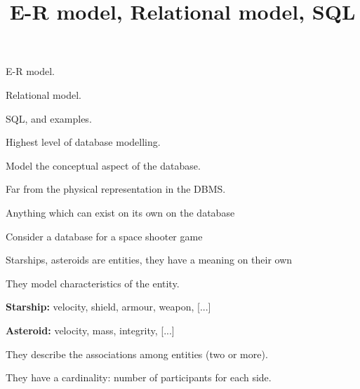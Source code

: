 \documentclass{beamer}
\title{E-R model, Relational model, SQL}
\author{ }
\institute{Hogeschool Rotterdam \\ 
Rotterdam, Netherlands}
\date{}
\begin{document}
\maketitle

\begin{slide}{
\item E-R model.
\item Relational model.
\item SQL, and examples.
}\end{slide}

\begin{slide}{
\item Highest level of database modelling.
\item Model the conceptual aspect of the database.
\item Far from the physical representation in the DBMS.
}\end{slide}

\begin{slide}{
\item Anything which can exist on its own on the database
\item Consider a database for a space shooter game
\item Starships, asteroids are entities, they have a meaning on their own

}\end{slide}

\begin{slide}{
\item They model characteristics of the entity.
\item \textbf{Starship:} velocity, shield, armour, weapon, [...]
\item \textbf{Asteroid:} velocity, mass, integrity, [...]

}\end{slide}

\begin{slide}{
\item They describe the associations among entities (two or more).
\item They have a cardinality: number of participants for each side.

}\end{slide}
\end{document}
